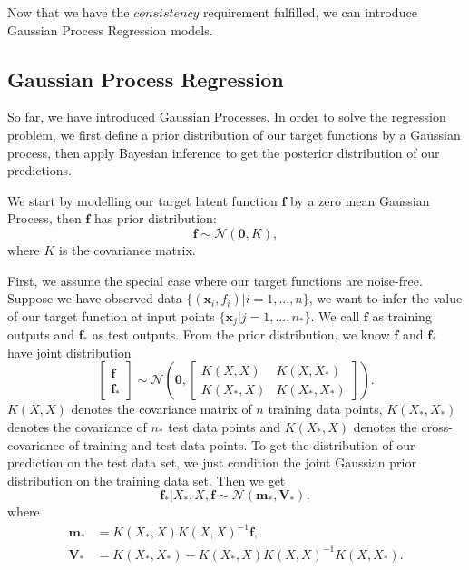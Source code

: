 \documentclass[12pt,a4paper]{article}
\theoremstyle{definition}
\numberwithin{equation}{section}
\let\vec\mathbf
\begin{document}
Now that we have the $consistency$ requirement fulfilled, we can introduce Gaussian Process Regression models.
\subsection{Gaussian Process Regression}
So far, we have introduced Gaussian Processes. In order to solve the regression problem, we first define a prior distribution of our target functions by a Gaussian process, then apply Bayesian inference to get the posterior distribution of our predictions. 

We start by modelling our target latent function $\vec f$ by a zero mean Gaussian Process, then $\vec f$ has prior distribution:
\begin{equation} \label{noise-free}
	\vec f \sim \mathcal{N}(\vec 0, K),
\end{equation}
where $K$ is the covariance matrix.

First, we assume the special case where our target functions are noise-free. Suppose we have observed data $\{(\vec x_i,f_i)|i=1,...,n\}$, we want to infer the value of our target function at input points $\{\vec x_j | j = 1,...,n_*\}$. We call $\vec f$ as training outputs and $\vec f_*$ as test outputs. From the prior distribution, we know 
$\vec f$ and $\vec f_*$ have joint distribution
\begin{equation} \label{}
	\begin{bmatrix}
	\vec f\\
	\vec f_*
	\end{bmatrix}
	\sim
	\mathcal{N}\left(\vec 0, 
	\begin{bmatrix}
	K(X,X) & K(X,X_*)\\
	K(X_*,X) & K(X_*,X_*)
	\end{bmatrix}
	\right).
\end{equation}
$K(X,X)$ denotes the covariance matrix of $n$ training data points, $K(X_*,X_*)$ denotes the covariance of $n_*$ test data points and $K(X_*,X)$ denotes the cross-covariance of training and test data points. To get the distribution of our prediction on the test data set, we just condition the joint Gaussian prior distribution on the training data set. Then we get
\begin{equation} \label{eq:pred1}
	\vec f_* | X_*, X, \vec f \sim \mathcal N (\vec m_*, \vec V_*),
\end{equation}
where
\begin{equation} \label{eq:pred2}
\begin{split}
\vec m_* &= K(X_*,X)K(X,X)^{-1}\vec f,\\
\vec V_* &= K(X_*,X_*) - K(X_*,X)K(X,X)^{-1}K(X,X_*).
\end{split}
\end{equation}
\end{document}
